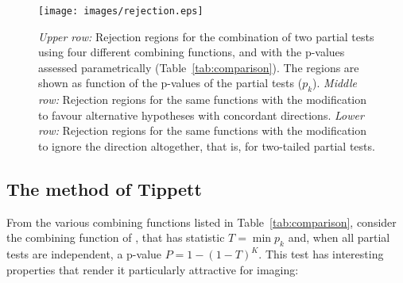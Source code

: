 \begin{figure}[p]
\begin{center}
\centerline{\texttt{[image: images/rejection.eps]}}
\end{center}
\caption{
\emph{Upper row:} Rejection regions for the combination of two partial tests using four different combining functions, and with the p-values assessed parametrically (Table~\ref{tab:comparison}). The regions are shown as function of the p-values of the partial tests ($p_k$).
\emph{Middle row:} Rejection regions for the same functions with the modification to favour alternative hypotheses with concordant directions.
\emph{Lower row:} Rejection regions for the same functions with the modification to ignore the direction altogether, that is, for two-tailed partial tests.}
\label{fig:rejection}
\end{figure}

\subsection{The method of Tippett}

From the various combining functions listed in Table~\ref{tab:comparison}, consider the combining function of \citet{Tippett1931}, that has statistic $T = \min {p_{k}}$ and, when all partial tests are independent, a p-value $P = 1-(1-T)^K$. This test has interesting properties that render it particularly attractive for imaging:

